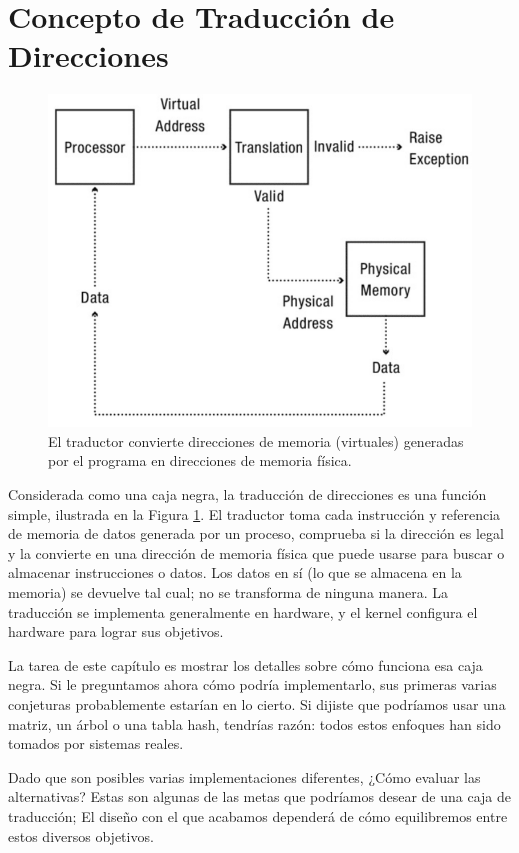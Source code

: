 \documentclass[10pt]{book}
\begin{document}
\section{Concepto de Traducción de Direcciones}
\begin{figure}[tbhp]
\centerline{\includegraphics[scale=0.70]{img/fig0801}}
\caption{El traductor convierte direcciones de memoria (virtuales) generadas por el programa en direcciones de memoria física.}
\label{fig0801}
\end{figure}

Considerada como una caja negra, la traducción de direcciones es una función simple, ilustrada en la Figura \ref{fig0801}. El traductor toma cada instrucción y referencia de memoria de datos generada por un proceso, comprueba si la dirección es legal y la convierte en una dirección de memoria física que puede usarse para buscar o almacenar instrucciones o datos. Los datos en sí (lo que se almacena en la memoria) se devuelve tal cual; no se transforma de ninguna manera. La traducción se implementa generalmente en hardware, y el kernel configura el hardware para lograr sus objetivos.

La tarea de este capítulo es mostrar los detalles sobre cómo funciona esa caja negra. Si le preguntamos ahora cómo podría implementarlo, sus primeras varias conjeturas probablemente estarían en lo cierto. Si dijiste que podríamos usar una matriz, un árbol o una tabla hash, tendrías razón: todos estos enfoques han sido tomados por sistemas reales.

Dado que son posibles varias implementaciones diferentes, ¿Cómo evaluar las alternativas? Estas son algunas de las metas que podríamos desear de una caja de traducción; El diseño con el que acabamos dependerá de cómo equilibremos entre estos diversos objetivos.
\end{document}
